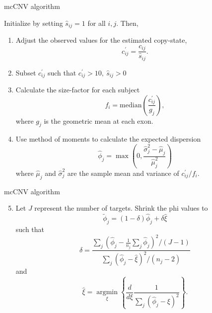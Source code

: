 \documentclass[
  10pt,
  ignorenonframetext,
  m]{beamer}
\providecommand{\tightlist}{%
  \setlength{\itemsep}{0pt}\setlength{\parskip}{0pt}}
\begin{document}
\begin{frame}{mcCNV algorithm}
\protect\hypertarget{mccnv-algorithm-2}{}

Initialize by setting \(\hat{s}_{ij} = 1\) for all \(i,j\). Then,

\begin{enumerate}
\item
  Adjust the observed values for the estimated copy-state, \[
    c_{ij}^{\prime} = \frac{c_{ij}}{\hat{s}_{ij}}.
    \]
\item
  Subset \(c_{ij}^{\prime}\) such that
  \(c_{ij}^{\prime} > 10, ~ \hat{s}_{ij} > 0\)
\item
  Calculate the size-factor for each subject \[
    f_i = \text{median}\left(\frac{c_{ij}^{\prime}}{g_j}\right),
    \] where \(g_j\) is the geometric mean at each exon.
\item
  Use method of moments to calculate the expected dispersion \[
    \hat\phi_j = \max\left(0, \frac{\hat\sigma_j^2 - \hat{\mu}_j}{\hat{\mu}_j^2}\right)
    \] where \(\hat{\mu}_j\) and \(\hat{\sigma}_j^2\) are the sample
  mean and variance of \(c_{ij}^{\prime}/f_i\).
\end{enumerate}

\end{frame}

\begin{frame}{mcCNV algorithm}
\protect\hypertarget{mccnv-algorithm-3}{}

\begin{enumerate}
\setcounter{enumi}{4}
\tightlist
\item
  Let \(J\) represent the number of targets. Shrink the phi values to \[
    \tilde\phi_j = (1 - \delta)\hat\phi_j + \delta\hat{\xi}
    \] such that \[
    \delta = \frac{\sum\limits_j\left(\hat\phi_j - \frac{1}{n_j}\sum\limits_j \hat\phi_j\right)^2/(J - 1)}
    {\sum\limits_j\left(\hat\phi_j - \hat{\xi}\right)^2/(n_j - 2)}
    \] and \[
    \hat{\xi} = \mathop{\text{argmin}}\limits_{\xi}\left\{
    \frac{d}{d\xi}\frac{1}{\sum\limits_j \left(\hat\phi_j - \xi\right)^2}
    \right\}.
    \]
\end{enumerate}

\end{frame}
\end{document}
